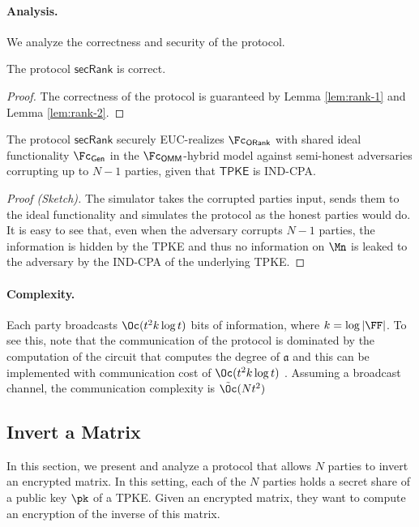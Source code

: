 
  \paragraph{Analysis.} We analyze the correctness and security of the protocol.
  \begin{lemma}[Correctness]
    The protocol $\mathsf{secRank}$ is correct.
  \end{lemma}{}
  \begin{proof}
    The correctness of the protocol is guaranteed by Lemma \ref{lem:rank-1} and Lemma \ref{lem:rank-2}.
  \end{proof}{}
  
  \begin{lemma}[Security]
    The protocol $\mathsf{secRank}$ securely EUC-realizes $\Fc_\mathsf{ORank}$  with shared ideal functionality $\Fc_\mathsf{Gen}$ in the $\Fc_\mathsf{OMM}$-hybrid model against semi-honest adversaries corrupting up to $N-1$ parties, given that $\mathsf{TPKE}$ is IND-CPA.
  \end{lemma}{}
  \begin{proof}[Proof (Sketch)]
    The simulator takes the corrupted parties input, sends them to the ideal functionality and simulates the protocol as the honest parties would do. It is easy to see that, even when the adversary corrupts $N-1$ parties, the information is hidden by the TPKE and thus no information on $\Mn$ is leaked to the adversary by the IND-CPA of the underlying TPKE.
  \end{proof}{}
  
  \paragraph{Complexity.} Each party broadcasts $\Oc(t^2k\log t)$ bits of information, where $k=\log | \FF|$. To see this, note that the communication of the protocol is  dominated by the computation of the  circuit that computes the degree of $\mathfrak{a}$ and this can be implemented with communication cost of $\Oc(t^2k\log t)$ \cite{TCC:KMWF07}. Assuming a broadcast channel, the communication complexity is $\tilde \Oc(Nt^2)$
  
\subsection{Invert a Matrix}
\label{subsec:invertmatrix}
  In this section, we present and analyze a protocol that allows $N$ parties to invert an encrypted matrix. In this setting, each of the $N$ parties holds a secret share of a public key $\pk$ of a TPKE. Given an encrypted matrix, they want to compute an encryption of the inverse of this matrix.
  
